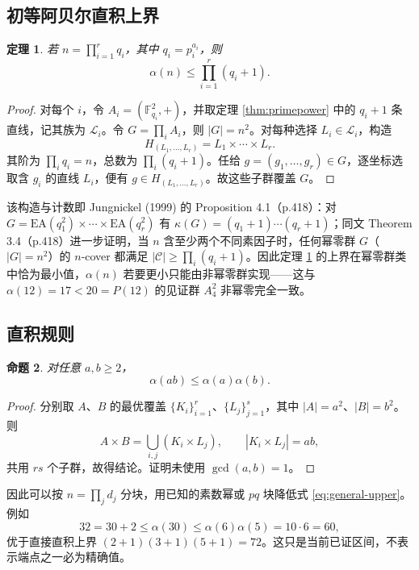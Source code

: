 \documentclass[11pt,a4paper]{article}
\numberwithin{equation}{section}
\theoremstyle{plain}
\newtheorem{theorem}{定理}[section]
\newtheorem{proposition}[theorem]{命题}
\theoremstyle{definition}
\theoremstyle{remark}
\newcommand{\F}{\mathbb{F}}
\newcommand{\calL}{\mathcal{L}}
\begin{document}
\subsection{初等阿贝尔直积上界}
\begin{theorem}\label{thm:general-upper}
若 $n=\prod_{i=1}^r q_i$，其中 $q_i=p_i^{a_i}$，则
\begin{equation}\label{eq:general-upper}
 \alpha(n)\le\prod_{i=1}^r(q_i+1).
\end{equation}
\end{theorem}
\begin{proof}
对每个 $i$，令 $A_i=(\F_{q_i}^2,+)$，并取定理 \ref{thm:primepower} 中的 $q_i+1$ 条直线，记其族为 $\calL_i$。令 $G=\prod_iA_i$，则 $|G|=n^2$。对每种选择 $L_i\in\calL_i$，构造
\begin{equation}
 H_{(L_1,\dots,L_r)}=L_1\times\cdots\times L_r.
\end{equation}
其阶为 $\prod_iq_i=n$，总数为 $\prod_i(q_i+1)$。任给 $g=(g_1,\dots,g_r)\in G$，逐坐标选取含 $g_i$ 的直线 $L_i$，便有 $g\in H_{(L_1,\dots,L_r)}$。故这些子群覆盖 $G$。
\end{proof}
该构造与计数即 Jungnickel (1999) 的 Proposition 4.1（p.418）：对 $G=\mathrm{EA}(q_1^2)\times\cdots\times\mathrm{EA}(q_r^2)$ 有 $\kappa(G)=(q_1+1)\cdots(q_r+1)$；同文 Theorem 3.4（p.418）进一步证明，当 $n$ 含至少两个不同素因子时，任何幂零群 $G$（$|G|=n^2$）的 $n$-cover 都满足 $|\mathcal C|\ge\prod_i(q_i+1)$。因此定理 \ref{thm:general-upper} 的上界在幂零群类中恰为最小值，$\alpha(n)$ 若要更小只能由非幂零群实现——这与 $\alpha(12)=17<20=P(12)$ 的见证群 $A_4^2$ 非幂零完全一致。

\subsection{直积规则}
\begin{proposition}\label{prop:product}
对任意 $a,b\ge2$，
\begin{equation}\label{eq:product-rule}
 \alpha(ab)\le\alpha(a)\alpha(b).
\end{equation}
\end{proposition}
\begin{proof}
分别取 $A$、$B$ 的最优覆盖 $\{K_i\}_{i=1}^r$、$\{L_j\}_{j=1}^s$，其中 $|A|=a^2$、$|B|=b^2$。则
\begin{equation}
 A\times B=\bigcup_{i,j}(K_i\times L_j),
 \qquad |K_i\times L_j|=ab,
\end{equation}
共用 $rs$ 个子群，故得结论。证明未使用 $\gcd(a,b)=1$。
\end{proof}
因此可以按 $n=\prod_jd_j$ 分块，用已知的素数幂或 $pq$ 块降低式 \eqref{eq:general-upper}。例如
\begin{equation}
 32=30+2\le\alpha(30)\le\alpha(6)\alpha(5)=10\cdot6=60,
\end{equation}
优于直接直积上界 $(2+1)(3+1)(5+1)=72$。这只是当前已证区间，不表示端点之一必为精确值。
\end{document}
